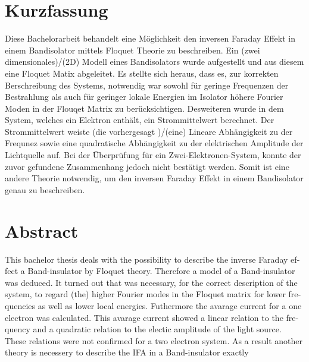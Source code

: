 \thispagestyle{plain}

\section*{Kurzfassung}
Diese Bachelorarbeit behandelt eine Möglichkeit
den inversen Faraday Effekt
in einem Bandisolator
mittels Floquet Theorie zu beschreiben.
Ein (zwei dimensionales)/(2D) Modell eines Bandisolators
wurde aufgestellt und aus diesem
eine Floquet Matix abgeleitet.
Es stellte sich heraus, dass es, zur
korrekten Berschreibung des Systems,
notwendig war
sowohl
für geringe Frequenzen der Bestrahlung
als auch für geringer lokale Energien
im Isolator
höhere Fourier Moden
in der Flouqet Matrix zu berücksichtigen.
Desweiteren wurde in dem System, welches
ein Elektron enthält, ein Strommittelwert
berechnet. Der Strommittelwert weiste
 (die vorhergesagt )/(eine)
Lineare Abhängigkeit
zu der Frequnez sowie eine quadratische Abhängigkeit
zu der elektrischen Amplitude der Lichtquelle auf.
Bei der Überprüfung für ein Zwei-Elektronen-System,
konnte der zuvor gefundene Zusammenhang
jedoch nicht bestätigt werden.
Somit ist eine andere Theorie notwendig,
um den inversen Faraday Effekt
in einem Bandisolator genau zu beschreiben.


\section*{Abstract}
\begin{english}
This bachelor thesis deals with the possibility to describe
the inverse Faraday effect a Band-insulator by Floquet theory.
Therefore a model of a Band-insulator was deduced.
It turned out that was necessary, for the
correct description of the system, to regard (the)
higher Fourier modes in the Floquet matrix  for lower frequencies
as well as lower local energies. Futhermore the
avarage current for a one electron was calculated.
This avarage current showed a linear relation to the
frequency and a quadratic relation to the electic amplitude
of the light source. These relations were not
confirmed for a two
electron system.
As a result another theory is necessery to describe the IFA
in a Band-insulator exactly
\end{english}
